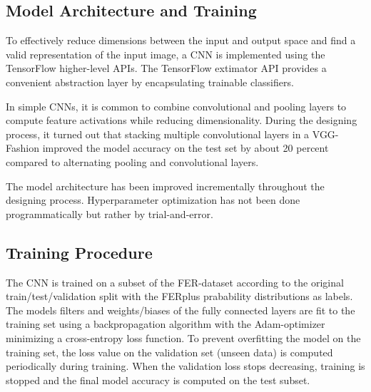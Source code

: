 \documentclass[twoside]{article}
\begin{document}
\begin{multicols}{2}

\section{Model Architecture and Training}
To effectively reduce dimensions between the input and output space and find a valid representation of the input image, a CNN is implemented using the TensorFlow higher-level APIs. The TensorFlow extimator API provides a convenient abstraction layer by encapsulating trainable classifiers.

In simple CNNs, it is common to combine convolutional and pooling layers to compute feature activations while reducing dimensionality. During the designing process, it turned out that stacking multiple convolutional layers in a VGG-Fashion \cite{simonyan14} improved the model accuracy on the test set by about 20 percent compared to alternating pooling and convolutional layers.

The model architecture has been improved incrementally throughout the designing process. Hyperparameter optimization has not been done programmatically but rather by trial-and-error.


\subsection{Training Procedure}
The CNN is trained on a subset of the FER-dataset according to the original train/test/validation split with the FERplus prabability distributions as labels. The models filters and weights/biases of the fully connected layers are fit to the training set using a backpropagation algorithm with the Adam-optimizer minimizing a cross-entropy loss function. To prevent overfitting the model on the training set, the loss value on the validation set (unseen data) is computed periodically during training. When the validation loss stops decreasing, training is stopped and the final model accuracy is computed on the test subset.



\end{multicols}
\end{document}
